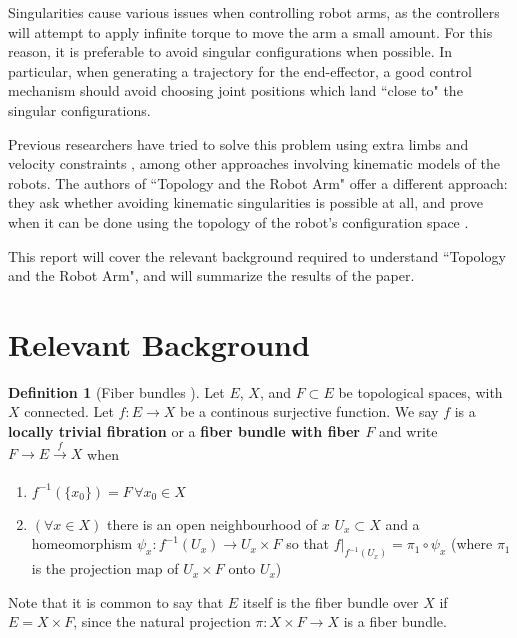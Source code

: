 \documentclass[12pt]{article}
\theoremstyle{definition}
\newtheorem{defn}{Definition}
\begin{document}
Singularities cause various issues when controlling robot arms, as the
controllers will attempt to apply infinite torque to move the arm a 
small amount. For this reason, it is preferable
to avoid singular configurations when possible. In particular, when generating a
trajectory for the end-effector, a good control mechanism should avoid choosing
joint positions which land ``close to" the singular configurations.

Previous researchers have tried to solve this problem using extra limbs
\cite{program-kin-red-manips} and velocity constraints
\cite{articulated-robot-redundancy}, among other approaches involving kinematic
models of the robots. The authors of
``Topology and the Robot Arm" offer a different approach: they ask whether
avoiding kinematic singularities is possible at all, and prove when it can be
done using the topology of the robot's configuration space
\cite{topology-robot-arm}.

This report will cover the relevant background required to understand 
``Topology and the Robot Arm",
and will summarize the results of the paper.

\section{Relevant Background}
\begin{defn}[Fiber bundles \cite{topology-fiber-bundles}]
    Let \(E\), \(X\), and \(F \subset E\) be topological spaces, 
    with \(X\) connected.
    Let \(f : E \rightarrow X\) be a continous surjective function. 
    We say \(f\) is a \textbf{locally trivial fibration} or a 
    \textbf{fiber bundle with fiber \(F\)} and write 
    \(F \rightarrow E \xrightarrow[]{f} X\) when
    \begin{enumerate}
        \item \(f^{-1}(\{x_0\}) = F \, \forall x_0 \in X\)
        \item \((\forall x \in X)\) there is an open neighbourhood of \(x\)
            \(U_x \subset X\) and a homeomorphism
            \(\psi_x : f^{-1}(U_x) \rightarrow U_x \times F\) so that
            \(f\vert_{f^{-1}(U_x)} = \pi_1 \circ \psi_x\) (where \(\pi_1\)
            is the projection map of \(U_x \times F\) onto \(U_x\))
    \end{enumerate}
    Note that it is common to say that \(E\) itself is the fiber bundle over
    \(X\) if \(E = X \times F\), since the natural projection 
    \(\pi : X \times F \rightarrow X\) is a fiber bundle.
\end{defn}
\end{document}
